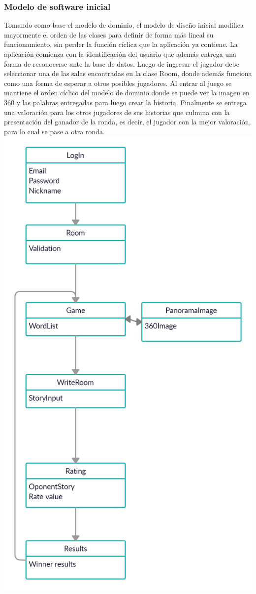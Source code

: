 \documentclass[12pt]{article}
\begin{document}
\subsubsection{Modelo de software inicial}
Tomando como base el modelo de dominio, el modelo de diseño inicial modifica mayormente el orden de las clases para definir de forma más lineal su funcionamiento, sin perder la función cíclica que la aplicación ya contiene.
La aplicación comienza con la identificación del usuario que además entrega una forma de reconocerse ante la base de datos. Luego de ingresar el jugador debe seleccionar una de las salas encontradas en la clase Room, donde además funciona como una forma de esperar a otros posibles jugadores. Al entrar al juego se mantiene el orden cíclico del modelo de dominio donde se puede ver la imagen en 360 y las palabras entregadas para luego crear la historia. Finalmente se entrega una valoración para los otros jugadores de sus historias que culmina con la presentación del ganador de la ronda, es decir, el jugador con la mejor valoración, para lo cual se pase a otra ronda.
\includegraphics[scale=.5]{imgs/ModeloSoftwareInicial.jpg}
\end{document}
